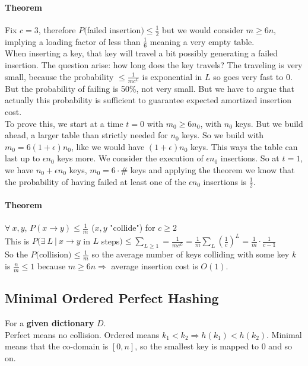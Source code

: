 \documentclass[10pt]{report}
\begin{document}
\paragraph{Theorem} Fix $c=3$, therefore $P($failed insertion$)\leq \frac{1}{2}$ but we would consider $m\geq 6n$, implying a loading factor of less than $\frac{1}{6}$ meaning a very empty table.\\
When inserting a key, that key will travel a bit possibly generating a failed insertion. The question arise: how long does the key travels? The traveling is very small, because the probability $\leq \frac{1}{mc^L}$ is exponential in $L$ so goes very fast to 0. But the probability of failing is 50\%, not very small. But we have to argue that actually this probability is sufficient to guarantee expected amortized insertion cost.\\
To prove this, we start at a time $t=0$ with $m_0\geq 6n_0$, with $n_0$ keys. But we build ahead, a larger table than strictly needed for $n_0$ keys. So we build with $m_0 = 6(1+\epsilon)n_0$, like we would have $(1+\epsilon)n_0$ keys. This ways the table can last up to $\epsilon n_0$ keys more. We consider the execution of $\epsilon n_0$ insertions. So at $t=1$, we have $n_0 + \epsilon n_0$ keys, $m_0 = 6\cdot\#$ keys and applying the theorem we know that the probability of having failed at least one of the $\epsilon n_0$ insertions is $\frac{1}{2}$.
\paragraph{Theorem} $\forall\:x,y$, $P(x\rightarrow y)\leq\frac{1}{m}$ ($x,y$ "collide") for $c\geq 2$\\
This is $P(\exists\:L\:|\:x\rightarrow y$ in $L$ steps$)\leq \sum_{L\geq1}=\frac{1}{mc^L}=\frac{1}{m}\sum_L \left(\frac{1}{c}\right)^L = \frac{1}{m}\cdot\frac{1}{c-1}$\\
So the $P($collision$)\leq \frac{1}{m}$ so the average number of keys colliding with some key $k$ is $\frac{n}{m}\leq 1$ because $m\geq 6n \Rightarrow$ average insertion cost is $O(1)$.
\subsection{Minimal Ordered Perfect Hashing} For a \textbf{given dictionary} $D$.\\
Perfect means no collision. Ordered means $k_1<k_2\Rightarrow h(k_1)<h(k_2)$. Minimal means that the co-domain is $[0,n]$, so the smallest key is mapped to 0 and so on.\\
\end{document}
